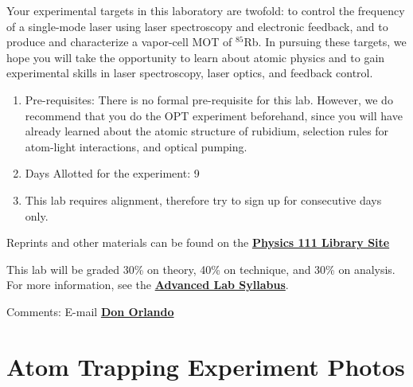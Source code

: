 \documentclass{../lab}
\begin{document}
Your experimental targets in this laboratory are twofold: to control the frequency of a single-mode laser using laser spectroscopy and electronic feedback, and to produce and characterize a vapor-cell MOT of $^{85}$Rb.  In pursuing these targets, we hope you will take the opportunity to learn about atomic physics and to gain experimental skills in laser spectroscopy, laser optics, and feedback control.

\begin{enumerate}
    \item Pre-requisites: There is no formal pre-requisite for this lab. However, we do recommend that you do the OPT experiment beforehand, since you will have already learned about the atomic structure of rubidium, selection rules for atom-light interactions, and optical pumping.

    \item Days Allotted for the experiment: 9

    \item This lab requires alignment, therefore try to sign up for consecutive days only.
\end{enumerate}

Reprints and other materials can be found on the \href{http://physics111.lib.berkeley.edu/Physics111/Reprints/MOT/MOT\_index.html}{\textbf{Physics 111 Library Site}}

This lab will be graded 30\% on theory, 40\% on technique, and 30\% on analysis. For more information, see the \href{http://experimentationlab.berkeley.edu/syllabus}{\textbf{Advanced Lab Syllabus}}.

Comments: E-mail \href{\MailDonOrlando}{\textbf{Don Orlando}}

\section{Atom Trapping Experiment Photos}
\end{document}
